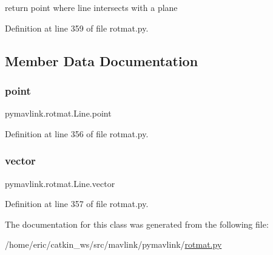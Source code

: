 \begin{DoxyVerb}return point where line intersects with a plane\end{DoxyVerb}
 

Definition at line 359 of file rotmat.\+py.



\subsection{Member Data Documentation}
\mbox{\label{classpymavlink_1_1rotmat_1_1Line_ae9557b1db18c60cf9a0a06b1b17e739c}} 
\subsubsection{\texorpdfstring{point}{point}}
{\footnotesize\ttfamily pymavlink.\+rotmat.\+Line.\+point}



Definition at line 356 of file rotmat.\+py.

\mbox{\label{classpymavlink_1_1rotmat_1_1Line_adaf0efb163f4cf8833c57d8f188757be}} 
\subsubsection{\texorpdfstring{vector}{vector}}
{\footnotesize\ttfamily pymavlink.\+rotmat.\+Line.\+vector}



Definition at line 357 of file rotmat.\+py.



The documentation for this class was generated from the following file\+:\begin{DoxyCompactItemize}
\item 
/home/eric/catkin\+\_\+ws/src/mavlink/pymavlink/\mbox{\hyperlink{rotmat_8py}{rotmat.\+py}}\end{DoxyCompactItemize}
